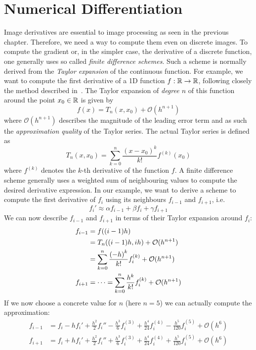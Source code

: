 \section{Numerical Differentiation}\label{sec:NumDiff}
Image derivatives are essential to image processing as seen in the previous chapter. 
Therefore, we need a way to compute them even on discrete images. To compute the 
gradient or, in the simpler case, the derivative of a discrete function, one 
generally uses so called \textit{finite difference schemes}. 
Such a scheme is normally derived from the \textit{Taylor expansion} of the continuous
function. For example, we want to compute the first derivative of a 1D function $f:\mathbb{R}
\rightarrow \mathbb{R}$, following closely the method described in~\cite{ipcv}.
The Taylor expansion of \textit{degree $n$} of this function around the point $x_0\in\mathbb{R}$ is given by 
\begin{equation}
    f(x) = T_n(x, x_0) + \mathcal{O}(h^{n+1})
\end{equation}
where $\mathcal{O}(h^{n+1})$ describes the magnitude of the leading error term and as such the
\textit{approximation quality} of the Taylor series.
The actual Taylor series is defined as
\begin{equation}
    T_n(x, x_0) = \sum\limits_{k=0}^{n} \frac{{(x-x_0)}^k}{k!}f^{(k)}(x_0)
\end{equation}
where $f^{(k)}$ denotes the $k$-th derivative of the function $f$.
A finite difference scheme generally uses a weighted sum of neighbouring values to compute the
desired derivative expression. In our example, we want to derive a scheme to compute the first
derivative of $f_i$ using its neighbours $f_{i-1}$ and $f_{i+1}$, i.e.
\begin{equation}
    f_i' \approx \alpha f_{i-1} + \beta f_i + \gamma f_{i+1}
\end{equation}
We can now describe $f_{i-1}$ and $f_{i+1}$ in terms of their Taylor expansion around $f_i$: 
\begin{align}
    f_{i-1} &= f((i-1)h) \notag\\
            &= T_n((i-1)h, ih) + \mathcal{O}(h^{n+1})\notag\\
            &= \sum\limits_{k=0}^{n}\frac{{(-h)}^k}{k!}f_i^{(k)}+ \mathcal{O}(h^{n+1})\\
    f_{i+1} &= \cdots = \sum\limits_{k=0}^{n}\frac{h^k}{k!}f_i^{(k)}+ \mathcal{O}(h^{n+1})
\end{align}
If we now choose a concrete value for $n$ (here $n=5$) we can actually compute the approximation:
\begin{align}
    f_{i-1} &= f_i - hf_i' + \frac{h^2}{2}f_i'' - \frac{h^3}{6}f_i^{(3)} + \frac{h^4}{24}f_i^{(4)} -
    \frac{h^5}{120}f_i^{(5)} + \mathcal{O}(h^6)\label{eq:fi-1}\\
    f_{i+1} &= f_i + hf_i' + \frac{h^2}{2}f_i'' + \frac{h^3}{6}f_i^{(3)} + \frac{h^4}{24}f_i^{(4)} +
    \frac{h^5}{120}f_i^{(5)} + \mathcal{O}(h^6)\label{eq:fi+1}
\end{align}
